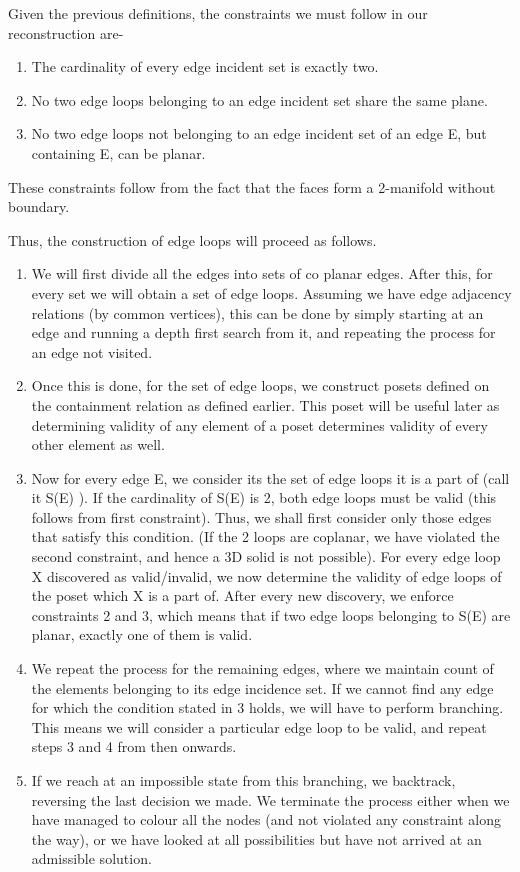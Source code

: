 \documentclass[12pt,a4paper]{article}
\begin{document}
 Given the previous definitions, the constraints we must follow in our reconstruction  are-
\begin{enumerate}
    \item The cardinality of every edge incident set is exactly two.
    \item No two edge loops belonging to an edge incident set share the same plane.
    \item No two  edge loops not belonging to an edge incident set of an edge E, but containing E, can be planar.
\end{enumerate}



These constraints follow  from the fact that the faces form a 2-manifold without boundary. \cite{principals} \newline

Thus, the construction of edge loops will proceed as follows. 
\begin{enumerate}

    \item  We will first divide all the edges into sets of co planar edges. After this, for every set we will obtain a set of edge loops. Assuming we have edge adjacency relations (by common vertices), this can be done by simply starting at an edge and running a depth first search from it, and repeating the process for an edge not visited.
    \item Once this is done, for the set of edge loops, we construct posets defined on the containment relation as defined earlier. This poset will be useful later as determining validity of any element of a poset determines validity of every other element as well.
    \item Now for every edge E, we consider its the set of edge loops it is a part of (call it S(E) ). If the cardinality of S(E) is 2, both edge loops must be valid (this follows from first constraint). Thus, we shall first consider only those edges that satisfy this condition. (If the 2 loops are coplanar, we have violated the second constraint, and hence a 3D solid is not possible). For every edge loop X discovered as valid/invalid, we now determine the validity of edge loops of the poset which X is a part of. After every new discovery, we enforce constraints 2 and 3, which means that if two edge loops belonging to S(E) are planar, exactly one of them is valid.
    \item We repeat the process for the remaining edges, where we maintain count of the elements belonging to its edge incidence set. If we cannot find any edge for which the condition stated in 3 holds, we will have to perform branching. This means we will consider a particular edge loop to be valid, and repeat steps 3 and 4 from then onwards. 
    \item If we reach at an impossible state from this branching, we backtrack, reversing the last decision we made. We terminate the process either when we have managed to colour all the nodes (and not violated any constraint along the way), or we have looked at all possibilities but have not arrived at an admissible solution.

\end{enumerate}
\end{document}
